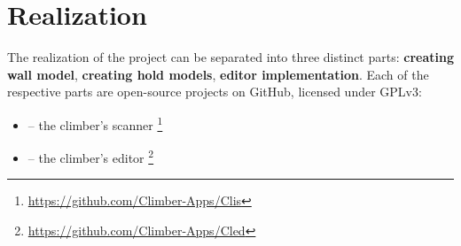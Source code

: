%
%
%
%
%
%

\chapter{Realization}

The realization of the project can be separated into three distinct parts: \textbf{creating wall model}, \textbf{creating hold models}, \textbf{editor implementation}. Each of the respective parts are open-source projects on GitHub, licensed under GPLv3:
\begin{itemize}
	\item \raisebox{-0.07em}{} -- the climber's scanner \footnote{\url{https://github.com/Climber-Apps/Clis}}
	\item \raisebox{-0.07em}{} -- the climber's editor \footnote{\url{https://github.com/Climber-Apps/Cled}}
\end{itemize}

